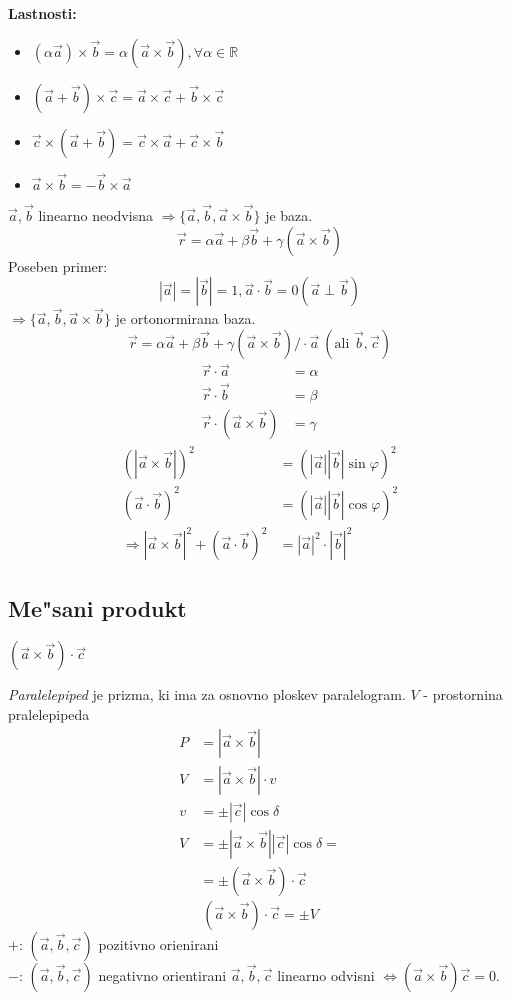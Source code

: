 %
\textbf{Lastnosti:}
\begin{itemize}
	\item $(\alpha \vec{a}) \times \vec{b} = \alpha (\vec{a} \times \vec{b}), \forall \alpha \in \mathbb{R}$
	\item $(\vec{a} + \vec{b}) \times \vec{c} = \vec{a} \times \vec{c} + \vec{b} \times \vec{c}$
	\item $\vec{c} \times (\vec{a} + \vec{b}) = \vec{c} \times \vec{a} + \vec{c} \times \vec{b}$
	\item $\vec{a} \times \vec{b} = - \vec{b} \times \vec{a}$
\end{itemize}

$\vec{a}, \vec{b}$ linearno neodvisna $\Rightarrow \{\vec{a}, \vec{b}, \vec{a} \times \vec{b}\}$ je baza.
\[\vec{r} = \alpha \vec{a} + \beta \vec{b} + \gamma(\vec{a} \times \vec{b})\]
Poseben primer:
\[|\vec{a}| = |\vec{b}| = 1, \vec{a} \cdot \vec{b} = 0 (\vec{a} \perp \vec{b})\]
$\Rightarrow \{\vec{a}, \vec{b}, \vec{a} \times \vec{b}\}$ je ortonormirana baza.
%
\[\vec{r} = \alpha \vec{a} + \beta \vec{b} + \gamma (\vec{a} \times \vec{b}) / \cdot \vec{a}\ (\text{ali } \vec{b}, \vec{c})\]
\begin{align*}
	\vec{r} \cdot \vec{a} &= \alpha\\
	\vec{r} \cdot \vec{b} &= \beta\\
	\vec{r} \cdot (\vec{a} \times \vec{b}) &= \gamma
\end{align*}
%
\begin{align*}
	(|\vec{a} \times \vec{b}|)^2 &= (|\vec{a}| |\vec{b}| \sin \varphi)^2\\
	(\vec{a} \cdot \vec{b})^2 &= (|\vec{a}| |\vec{b}| \cos \varphi)^2\\
	\Rightarrow |\vec{a} \times \vec{b}|^2 + (\vec{a} \cdot \vec{b})^2 &= |\vec{a}|^2 \cdot |\vec{b}|^2
\end{align*}
%
\subsection{Me"sani produkt}
$(\vec{a} \times \vec{b}) \cdot \vec{c}$

\emph{Paralelepiped} je prizma, ki ima za osnovno ploskev paralelogram.
$V$ - prostornina pralelepipeda\\
\begin{align*}
	P &= |\vec{a} \times \vec{b}|\\
	V &= |\vec{a} \times \vec{b}| \cdot v\\
	v &= \pm |\vec{c}| \cos \delta\\
	V &= \pm |\vec{a} \times \vec{b}| |\vec{c}| \cos \delta =\\
	&= \pm (\vec{a} \times \vec{b}) \cdot \vec{c}
\end{align*}
%
\[(\vec{a} \times \vec{b}) \cdot \vec{c} = \pm V\]
$+$: $(\vec{a}, \vec{b}, \vec{c})$ pozitivno orienirani\\
$-$: $(\vec{a}, \vec{b}, \vec{c})$ negativno orientirani
%
$\vec{a}, \vec{b}, \vec{c}$ linearno odvisni $\Leftrightarrow (\vec{a} \times \vec{b})\vec{c} = 0$.

